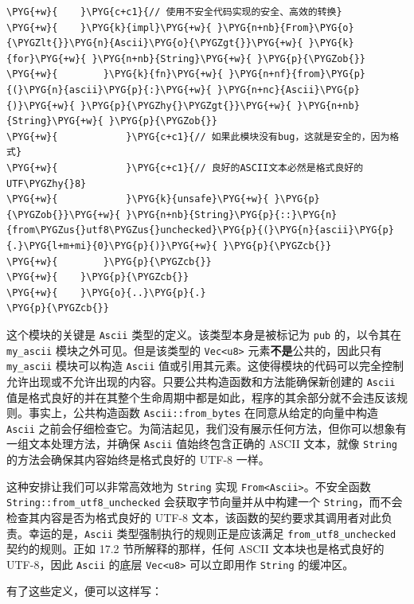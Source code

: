 \begin{Verbatim}[commandchars=\\\{\},breaklines=true,breakanywhere=true,fontsize=\codefont,xleftmargin=17bp]
\PYG{+w}{    }\PYG{c+c1}{// 使用不安全代码实现的安全、高效的转换}
\PYG{+w}{    }\PYG{k}{impl}\PYG{+w}{ }\PYG{n+nb}{From}\PYG{o}{\PYGZlt{}}\PYG{n}{Ascii}\PYG{o}{\PYGZgt{}}\PYG{+w}{ }\PYG{k}{for}\PYG{+w}{ }\PYG{n+nb}{String}\PYG{+w}{ }\PYG{p}{\PYGZob{}}
\PYG{+w}{        }\PYG{k}{fn}\PYG{+w}{ }\PYG{n+nf}{from}\PYG{p}{(}\PYG{n}{ascii}\PYG{p}{:}\PYG{+w}{ }\PYG{n+nc}{Ascii}\PYG{p}{)}\PYG{+w}{ }\PYG{p}{\PYGZhy{}\PYGZgt{}}\PYG{+w}{ }\PYG{n+nb}{String}\PYG{+w}{ }\PYG{p}{\PYGZob{}}
\PYG{+w}{            }\PYG{c+c1}{// 如果此模块没有bug，这就是安全的，因为格式}
\PYG{+w}{            }\PYG{c+c1}{// 良好的ASCII文本必然是格式良好的UTF\PYGZhy{}8}
\PYG{+w}{            }\PYG{k}{unsafe}\PYG{+w}{ }\PYG{p}{\PYGZob{}}\PYG{+w}{ }\PYG{n+nb}{String}\PYG{p}{::}\PYG{n}{from\PYGZus{}utf8\PYGZus{}unchecked}\PYG{p}{(}\PYG{n}{ascii}\PYG{p}{.}\PYG{l+m+mi}{0}\PYG{p}{)}\PYG{+w}{ }\PYG{p}{\PYGZcb{}}
\PYG{+w}{        }\PYG{p}{\PYGZcb{}}
\PYG{+w}{    }\PYG{p}{\PYGZcb{}}
\PYG{+w}{    }\PYG{o}{..}\PYG{p}{.}
\PYG{p}{\PYGZcb{}}
\end{Verbatim}

这个模块的关键是 \texttt{Ascii} 类型的定义。该类型本身是被标记为 \texttt{pub} 的，以令其在 \texttt{my\_ascii} 模块之外可见。但是该类型的 \texttt{Vec<u8>} 元素\textbf{不是}公共的，因此只有 \texttt{my\_ascii} 模块可以构造 \texttt{Ascii} 值或引用其元素。这使得模块的代码可以完全控制允许出现或不允许出现的内容。只要公共构造函数和方法能确保新创建的 \texttt{Ascii} 值是格式良好的并在其整个生命周期中都是如此，程序的其余部分就不会违反该规则。事实上，公共构造函数 \texttt{Ascii::from\_bytes} 在同意从给定的向量中构造 \texttt{Ascii} 之前会仔细检查它。为简洁起见，我们没有展示任何方法，但你可以想象有一组文本处理方法，并确保 \texttt{Ascii} 值始终包含正确的 ASCII 文本，就像 \texttt{String} 的方法会确保其内容始终是格式良好的 UTF-8 一样。

这种安排让我们可以非常高效地为 \texttt{String} 实现 \texttt{From<Ascii>}。不安全函数 \texttt{String::from\_utf8\_unchecked} 会获取字节向量并从中构建一个 \texttt{String}，而不会检查其内容是否为格式良好的 UTF-8 文本，该函数的契约要求其调用者对此负责。幸运的是，\texttt{Ascii} 类型强制执行的规则正是应该满足 \texttt{from\_utf8\_unchecked} 契约的规则。正如 17.2 节所解释的那样，任何 ASCII 文本块也是格式良好的 UTF-8，因此 \texttt{Ascii} 的底层 \texttt{Vec<u8>} 可以立即用作 \texttt{String} 的缓冲区。

有了这些定义，便可以这样写：

